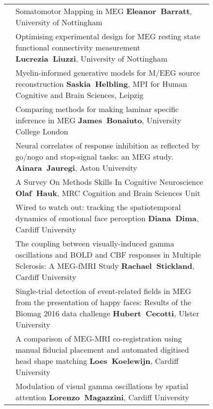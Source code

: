 \begin{figure}[htp]
\begin{tabularx}{\textwidth}{lp{.92\linewidth}}
\cellcolor{set1!50}{\bf A-20} & {\footnotesize Somatomotor Mapping in MEG
} {\bf\footnotesize Eleanor~Barratt}, {\footnotesize University of Nottingham}  \\
\cellcolor{set3!50}{\bf A-21} & {\footnotesize Optimising experimental design for MEG resting state functional connectivity measurement
} {\bf\footnotesize Lucrezia~Liuzzi}, {\footnotesize University of Nottingham}  \\
\cellcolor{set3!50}{\bf A-22} & {\footnotesize Myelin-informed generative models for M/EEG source reconstruction} {\bf\footnotesize Saskia~Helbling}, {\footnotesize MPI for Human Cognitive and Brain Sciences, Leipzig}  \\
\cellcolor{set3!50}{\bf A-23} & {\footnotesize Comparing methods for making laminar specific inference in MEG} {\bf\footnotesize James~Bonaiuto}, {\footnotesize University College London}  \\
\cellcolor{set1!50}{\bf A-24} & {\footnotesize Neural correlates of response inhibition as reflected by go/nogo and stop-signal tasks: an MEG study.
} {\bf\footnotesize Ainara~Jauregi}, {\footnotesize Aston University}  \\
\cellcolor{set3!50}{\bf A-25} & {\footnotesize A Survey On Methods Skills In Cognitive Neuroscience
} {\bf\footnotesize Olaf~Hauk}, {\footnotesize MRC Cognition and Brain Sciences Unit}  \\
\cellcolor{set1!50}{\bf A-26} & {\footnotesize Wired to watch out: tracking the spatiotemporal dynamics of emotional face perception
} {\bf\footnotesize Diana~Dima}, {\footnotesize Cardiff University}  \\
\cellcolor{set2!50}{\bf A-27} & {\footnotesize The coupling between visually-induced gamma oscillations and BOLD and CBF responses in Multiple Sclerosis: A MEG-fMRI Study
} {\bf\footnotesize Rachael~Stickland}, {\footnotesize Cardiff University}  \\
\cellcolor{set3!50}{\bf A-28} & {\footnotesize Single-trial detection of event-related fields in MEG from the presentation of happy faces: Results of the Biomag 2016 data challenge
} {\bf\footnotesize Hubert~Cecotti}, {\footnotesize Ulster University}  \\
\cellcolor{set3!50}{\bf A-29} & {\footnotesize A comparison of MEG-MRI co-registration using manual fiducial placement and automated digitised head shape matching
} {\bf\footnotesize Loes~Koelewijn}, {\footnotesize Cardiff University}  \\
\cellcolor{set1!50}{\bf A-30} & {\footnotesize Modulation of visual gamma oscillations by spatial attention} {\bf\footnotesize Lorenzo~Magazzini}, {\footnotesize Cardiff University}  \\

\end{tabularx}
\end{figure}
